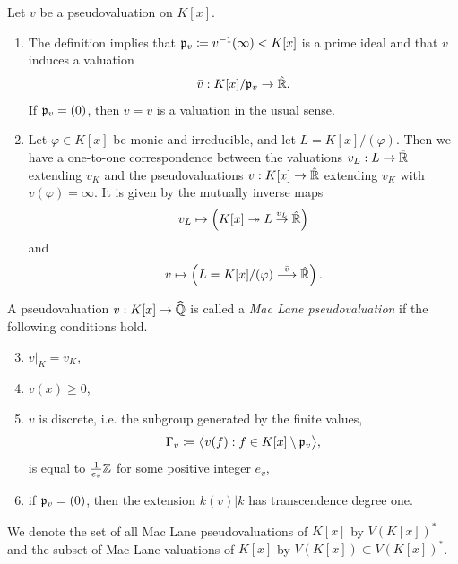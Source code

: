 \begin{remark}
    Let $v$ be a pseudovaluation on $K[x]$.
    \begin{enumerate}[label=\textup{(\alph*)}]
        \item The definition implies that $\mathfrak p_v \coloneqq v^{-1}(\infty) < K[x]$ is a prime ideal
            and that $v$ induces a valuation
            \begin{align}
                \bar{v}: K[x]/\mathfrak p_v \to \hat{\mathbb R}.
            \end{align}
            If $\mathfrak p_v = (0)$, then $v=\bar{v}$ is a valuation in the usual sense.
        \item Let $\varphi\in K[x]$ be monic and irreducible, and let
            $L=K[x]/(\varphi)$.
            Then we have a one-to-one correspondence between the valuations $v_L: L \to \hat{\mathbb R}$ extending $v_K$ and
            the pseudovaluations $v: K[x] \to \hat{\mathbb R}$ extending $v_K$ with $v(\varphi)=\infty$.
            It is given by the mutually inverse maps
            \begin{align}
                v_L \mapsto \left( K[x] \twoheadrightarrow L \overset{v_L}{\to} \hat{\mathbb R} \right)
            \end{align}
            and
            \begin{align}
                v \mapsto \left(L=K[x]/(\varphi) \overset{\bar{v}}{\longrightarrow} \hat{\mathbb R}\right).
            \end{align}
    \end{enumerate}
\end{remark}

\begin{definition}
    A pseudovaluation $v: K[x] \to \widehat{\mathbb Q}$ is called a \textit{Mac Lane pseudovaluation} if the following conditions hold.
    \begin{enumerate}[label=\textup{(\alph*)}]
        \setcounter{enumi}{2}
        \item $v|_K = v_K$,
        \item $v(x) \geq 0$,
        \item $v$ is discrete, i.e. the subgroup generated by the finite values,
            \begin{align}
                \Gamma_v\coloneqq\bigl\langle v(f):f\in K[x]\setminus\mathfrak p_v\bigr\rangle,
            \end{align}
            is equal to $\frac{1}{e_v}\mathbb Z$ for some positive integer $e_v$,
        \item if $\mathfrak p_v = (0)$, then the extension $k(v)|k$ has transcendence degree one.
    \end{enumerate}
    We denote the set of all Mac Lane pseudovaluations of $K[x]$ by $V(K[x])^*$ and the subset of Mac Lane valuations of $K[x]$ by $V(K[x]) \subset V(K[x])^*$.
\end{definition}

